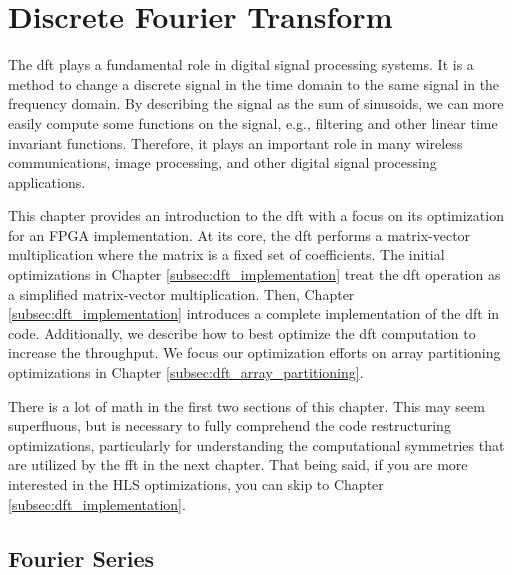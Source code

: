 
\chapter{Discrete Fourier Transform}
\glsresetall
\label{chapter:dft}


The \gls{dft} plays a fundamental role in digital signal processing systems. It is a method to change a discrete signal in the time domain to the same signal in the frequency domain.  By describing the signal as the sum of sinusoids, we can more easily compute some functions on the signal, e.g., filtering and other linear time invariant functions.  Therefore, it plays an important role in many wireless communications, image processing, and other digital signal processing applications.

This chapter provides an introduction to the \gls{dft} with a focus on its optimization for an FPGA implementation. At its core, the \gls{dft} performs a matrix-vector multiplication where the matrix is a fixed set of coefficients. The initial optimizations in Chapter \ref{subsec:dft_implementation} treat the \gls{dft} operation as a simplified matrix-vector multiplication. Then, Chapter \ref{subsec:dft_implementation} introduces a complete implementation of the \gls{dft} in \VHLS code. Additionally, we describe how to best optimize the \gls{dft} computation to increase the throughput. We focus our optimization efforts on array partitioning optimizations in Chapter \ref{subsec:dft_array_partitioning}.


There is a lot of math in the first two sections of this chapter. This may seem superfluous, but is necessary to fully comprehend the code restructuring optimizations, particularly for understanding the computational symmetries that are utilized by the \gls{fft} in the next chapter. That being said, if you are more interested in the HLS optimizations, you can skip to Chapter \ref{subsec:dft_implementation}. 

\section{Fourier Series}

